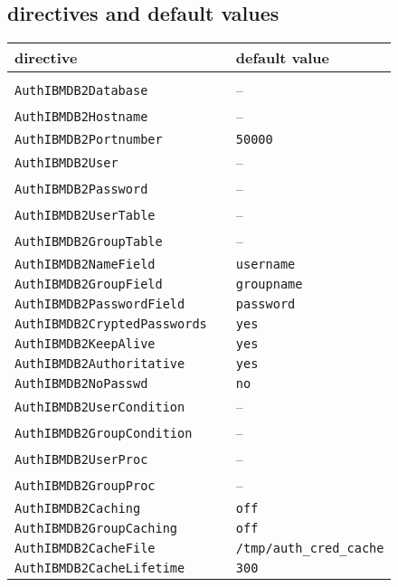 \documentclass[11pt,letterpaper]{article}
\begin{document}
\begin{appendix}
\section{directives and default values} \label{default}
\vspace{5ex}
\begin{tabular}{@{} lll @{}}
directive & & default value \\
\hline
& & \\
{\tt AuthIBMDB2Database} & & -- \\[0.5ex]
{\tt AuthIBMDB2Hostname} & & -- \\[0.5ex]
{\tt AuthIBMDB2Portnumber} & & {\tt 50000} \\[0.5ex]
{\tt AuthIBMDB2User} & & -- \\[0.5ex]
{\tt AuthIBMDB2Password} & & -- \\[0.5ex]
{\tt AuthIBMDB2UserTable} & & -- \\[0.5ex]
{\tt AuthIBMDB2GroupTable} & & -- \\[0.5ex]
{\tt AuthIBMDB2NameField} & & {\tt username} \\[0.5ex]
{\tt AuthIBMDB2GroupField} & & {\tt groupname} \\[0.5ex]
{\tt AuthIBMDB2PasswordField} & & {\tt password} \\[0.5ex]
{\tt AuthIBMDB2CryptedPasswords} & & {\tt yes} \\[0.5ex]
{\tt AuthIBMDB2KeepAlive} & & {\tt yes} \\[0.5ex]
{\tt AuthIBMDB2Authoritative} & & {\tt yes} \\[0.5ex]
{\tt AuthIBMDB2NoPasswd} & & {\tt no} \\[0.5ex]
{\tt AuthIBMDB2UserCondition} & & -- \\[0.5ex]
{\tt AuthIBMDB2GroupCondition} & & -- \\[0.5ex]
{\tt AuthIBMDB2UserProc} & & -- \\[0.5ex]
{\tt AuthIBMDB2GroupProc} & & -- \\[0.5ex]
{\tt AuthIBMDB2Caching} & & {\tt off} \\[0.5ex]
{\tt AuthIBMDB2GroupCaching} & & {\tt off} \\[0.5ex]
{\tt AuthIBMDB2CacheFile} & & {\tt /tmp/auth\_cred\_cache} \\[0.5ex]
{\tt AuthIBMDB2CacheLifetime} & & {\tt 300} \\[0.5ex]
\end{tabular}
\newpage


\newpage


\end{appendix}
\end{document}

